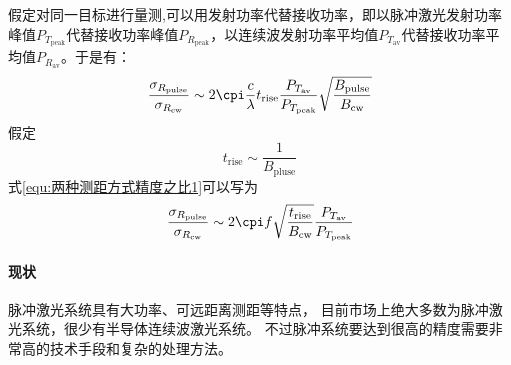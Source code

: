假定对同一目标进行量测,可以用发射功率代替接收功率，即以脉冲激光发射功率峰值$ P_{T_{\text{peak}}} $代替接收功率峰值$ P_{R_{\text{peak}}} $，以连续波发射功率平均值$ P_{T_{\text{av}}} $代替接收功率平均值$ P_{R_{\text{av}}} $。于是有：
\begin{equation}\label{equ:两种测距方式精度之比1}
\dfrac{\sigma_{R_{\text{pulse}}}}{\sigma_{R_{\text{cw}}}} \sim 2\cpi \dfrac{c}{\lambda}t_{\text{rise}} \dfrac{P_{T_{\text{av}}}}{P_{T_{\text{peak}}}} \sqrt{\dfrac{B_{\text{pulse}}}{B_{\text{cw}}}}
\end{equation}
假定
\begin{equation}
t_{\text{rise}} \sim \dfrac{1}{B_{\text{pluse}}}
\end{equation}
式\eqref{equ:两种测距方式精度之比1}可以写为
\begin{equation}
\dfrac{\sigma_{R_{\text{pulse}}}}{\sigma_{R_{\text{cw}}}} \sim 2\cpi f \sqrt{\dfrac{t_{\text{rise}}}{B_{\text{cw}}}} \dfrac{P_{T_{\text{av}}}}{P_{T_{\text{peak}}}}
\end{equation}

\paragraph{现状}脉冲激光系统具有大功率、可远距离测距等特点，
目前市场上绝大多数为脉冲激光系统，很少有半导体连续波激光系统。
不过脉冲系统要达到很高的精度需要非常高的技术手段和复杂的处理方法。

